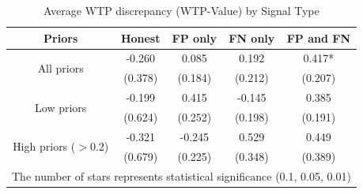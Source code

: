 \begin{table}[H]\centering \caption{Average WTP discrepancy (WTP-Value) by Signal Type} \begin{tabular}{ccccc} \hline \hline
\textbf{Priors}&\textbf{Honest}& \textbf{FP only} &\textbf{FN only}& \textbf{FP and FN}\\ \hline
\multirow{2}{*}{All priors}&-0.260&0.085&0.192&0.417*\\
&(0.378)&(0.184)&(0.212)&(0.207)\\
\multirow{2}{*}{Low priors}&-0.199&0.415&-0.145&0.385\\
&(0.624)&(0.252)&(0.198)&(0.191)\\
\multirow{2}{*}{High priors ($>$0.2)}&-0.321&-0.245&0.529&0.449\\
&(0.679)&(0.225)&(0.348)&(0.389)\\
\hline \multicolumn{5}{l}{\footnotesize *The number of stars represents statistical significance (0.1, 0.05, 0.01)} \\ \end{tabular} \end{table}

